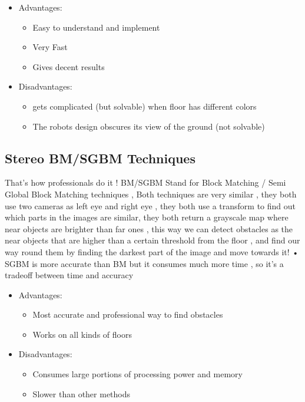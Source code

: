 \documentclass[12pt]{book}
\begin{document}
\begin{itemize}
	\item Advantages:
	\begin{itemize}
		\item Easy to understand and implement 
		\item Very Fast
		\item Gives decent results
		
	\end{itemize}
	\item Disadvantages:
	\begin{itemize}
		\item gets complicated (but solvable) when floor has different colors 
		\item The robots design obscures its view of the ground (not solvable)
		
	\end{itemize}
\end{itemize}

\subsection{Stereo BM/SGBM Techniques}
That’s how professionals do it ! BM/SGBM Stand for Block Matching / Semi Global Block Matching techniques , Both techniques are very similar , they both use two cameras as left eye and right eye , they both use a transform to find out which parts in the images are similar, they both return a grayscale map where near objects are brighter than far ones , this way we can detect obstacles as the near objects that are higher than a certain threshold from the floor , and find our way round them by finding the darkest part of the image and move towards it!
•	SGBM is more accurate than BM but it consumes much more time , so it’s a tradeoff between time and accuracy

\begin{itemize}
	\item Advantages:
	\begin{itemize}
		\item Most accurate and professional way to find obstacles
		\item Works on all kinds of floors
	\end{itemize}
	\item Disadvantages:
	\begin{itemize}
		\item Consumes large portions of processing power and memory
		\item Slower than other methods
	\end{itemize}
\end{itemize}
\end{document}
